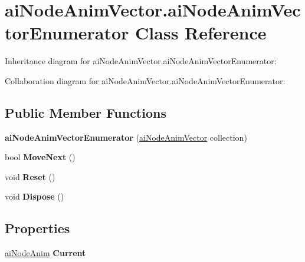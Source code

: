 \hypertarget{classai_node_anim_vector_1_1ai_node_anim_vector_enumerator}{\section{ai\+Node\+Anim\+Vector.\+ai\+Node\+Anim\+Vector\+Enumerator Class Reference}
\label{classai_node_anim_vector_1_1ai_node_anim_vector_enumerator}
}


Inheritance diagram for ai\+Node\+Anim\+Vector.\+ai\+Node\+Anim\+Vector\+Enumerator\+:


Collaboration diagram for ai\+Node\+Anim\+Vector.\+ai\+Node\+Anim\+Vector\+Enumerator\+:
\subsection*{Public Member Functions}
\begin{DoxyCompactItemize}
\item 
\hypertarget{classai_node_anim_vector_1_1ai_node_anim_vector_enumerator_a8d823910d516f34f5bed5baf8a3480ee}{{\bfseries ai\+Node\+Anim\+Vector\+Enumerator} (\hyperlink{classai_node_anim_vector}{ai\+Node\+Anim\+Vector} collection)}\label{classai_node_anim_vector_1_1ai_node_anim_vector_enumerator_a8d823910d516f34f5bed5baf8a3480ee}

\item 
\hypertarget{classai_node_anim_vector_1_1ai_node_anim_vector_enumerator_aec48fbc55ce64fa3f8de35c67dc9764c}{bool {\bfseries Move\+Next} ()}\label{classai_node_anim_vector_1_1ai_node_anim_vector_enumerator_aec48fbc55ce64fa3f8de35c67dc9764c}

\item 
\hypertarget{classai_node_anim_vector_1_1ai_node_anim_vector_enumerator_a93885da4e59a6718bc87924dd0bb8390}{void {\bfseries Reset} ()}\label{classai_node_anim_vector_1_1ai_node_anim_vector_enumerator_a93885da4e59a6718bc87924dd0bb8390}

\item 
\hypertarget{classai_node_anim_vector_1_1ai_node_anim_vector_enumerator_ae07a79ed71c7369ab26901cd361ddd74}{void {\bfseries Dispose} ()}\label{classai_node_anim_vector_1_1ai_node_anim_vector_enumerator_ae07a79ed71c7369ab26901cd361ddd74}

\end{DoxyCompactItemize}
\subsection*{Properties}
\begin{DoxyCompactItemize}
\item 
\hypertarget{classai_node_anim_vector_1_1ai_node_anim_vector_enumerator_a9935f020d26edf44dd35c98933e634fd}{\hyperlink{structai_node_anim}{ai\+Node\+Anim} {\bfseries Current}}\label{classai_node_anim_vector_1_1ai_node_anim_vector_enumerator_a9935f020d26edf44dd35c98933e634fd}

\end{DoxyCompactItemize}


